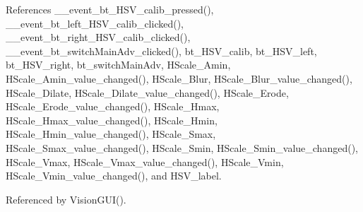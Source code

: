 References \+\_\+\+\_\+event\+\_\+bt\+\_\+\+H\+S\+V\+\_\+calib\+\_\+pressed(), \+\_\+\+\_\+event\+\_\+bt\+\_\+left\+\_\+\+H\+S\+V\+\_\+calib\+\_\+clicked(), \+\_\+\+\_\+event\+\_\+bt\+\_\+right\+\_\+\+H\+S\+V\+\_\+calib\+\_\+clicked(), \+\_\+\+\_\+event\+\_\+bt\+\_\+switch\+Main\+Adv\+\_\+clicked(), bt\+\_\+\+H\+S\+V\+\_\+calib, bt\+\_\+\+H\+S\+V\+\_\+left, bt\+\_\+\+H\+S\+V\+\_\+right, bt\+\_\+switch\+Main\+Adv, H\+Scale\+\_\+\+Amin, H\+Scale\+\_\+\+Amin\+\_\+value\+\_\+changed(), H\+Scale\+\_\+\+Blur, H\+Scale\+\_\+\+Blur\+\_\+value\+\_\+changed(), H\+Scale\+\_\+\+Dilate, H\+Scale\+\_\+\+Dilate\+\_\+value\+\_\+changed(), H\+Scale\+\_\+\+Erode, H\+Scale\+\_\+\+Erode\+\_\+value\+\_\+changed(), H\+Scale\+\_\+\+Hmax, H\+Scale\+\_\+\+Hmax\+\_\+value\+\_\+changed(), H\+Scale\+\_\+\+Hmin, H\+Scale\+\_\+\+Hmin\+\_\+value\+\_\+changed(), H\+Scale\+\_\+\+Smax, H\+Scale\+\_\+\+Smax\+\_\+value\+\_\+changed(), H\+Scale\+\_\+\+Smin, H\+Scale\+\_\+\+Smin\+\_\+value\+\_\+changed(), H\+Scale\+\_\+\+Vmax, H\+Scale\+\_\+\+Vmax\+\_\+value\+\_\+changed(), H\+Scale\+\_\+\+Vmin, H\+Scale\+\_\+\+Vmin\+\_\+value\+\_\+changed(), and H\+S\+V\+\_\+label.



Referenced by Vision\+G\+U\+I().


